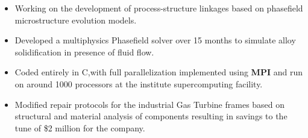 \documentclass[10pt,a4paper]{altacv}
\begin{document}
\divider

\begin{itemize}
\item Working on the development of process-structure linkages based on phasefield microstructure evolution models.
\end{itemize}
\divider

\begin{itemize}
\item Developed a multiphysics Phasefield solver over 15 months to simulate alloy solidification in presence of fluid flow.
\item Coded entirely in C,with full
parallelization implemented using \textbf{MPI}
and run on around 1000 processors at the institute supercomputing facility.
\end{itemize}
\divider


\begin{itemize}
\item Modified repair protocols for the industrial Gas Turbine frames based on structural and material analysis of components resulting in savings to the tune of \$2 million for the company.
\end{itemize}

%

\clearpage
\end{document}
